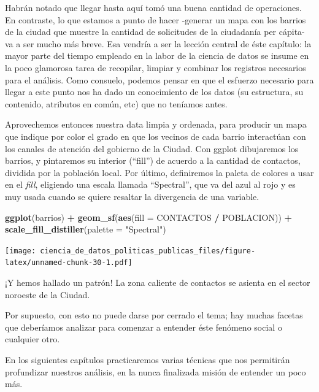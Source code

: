 \documentclass[]{book}
\newenvironment{Shaded}{\begin{snugshade}}{\end{snugshade}}
\newcommand{\KeywordTok}[1]{\textcolor[rgb]{0.13,0.29,0.53}{\textbf{#1}}}
\newcommand{\DataTypeTok}[1]{\textcolor[rgb]{0.13,0.29,0.53}{#1}}
\newcommand{\StringTok}[1]{\textcolor[rgb]{0.31,0.60,0.02}{#1}}
\newcommand{\OperatorTok}[1]{\textcolor[rgb]{0.81,0.36,0.00}{\textbf{#1}}}
\newcommand{\NormalTok}[1]{#1}
\begin{document}
Habrán notado que llegar hasta aquí tomó una buena cantidad de
operaciones. En contraste, lo que estamos a punto de hacer -generar un
mapa con los barrios de la ciudad que muestre la cantidad de solicitudes
de la ciudadanía per cápita- va a ser mucho más breve. Esa vendría a ser
la lección central de éste capítulo: la mayor parte del tiempo empleado
en la labor de la ciencia de datos se insume en la poco glamorosa tarea
de recopilar, limpiar y combinar los registros necesarios para el
análisis. Como consuelo, podemos pensar en que el esfuerzo necesario
para llegar a este punto nos ha dado un conocimiento de los datos (su
estructura, su contenido, atributos en común, etc) que no teníamos
antes.

Aprovechemos entonces nuestra data limpia y ordenada, para producir un
mapa que indique por color el grado en que los vecinos de cada barrio
interactúan con los canales de atención del gobierno de la Ciudad. Con
ggplot dibujaremos los barrios, y pintaremos su interior (``fill'') de
acuerdo a la cantidad de contactos, dividida por la población local. Por
último, definiremos la paleta de colores a usar en el \emph{fill},
eligiendo una escala llamada ``Spectral'', que va del azul al rojo y es
muy usada cuando se quiere resaltar la divergencia de una variable.

\begin{Shaded}
\begin{Highlighting}[]
\KeywordTok{ggplot}\NormalTok{(barrios) }\OperatorTok{+}
\StringTok{    }\KeywordTok{geom_sf}\NormalTok{(}\KeywordTok{aes}\NormalTok{(}\DataTypeTok{fill =}\NormalTok{ CONTACTOS }\OperatorTok{/}\StringTok{ }\NormalTok{POBLACION)) }\OperatorTok{+}
\StringTok{    }\KeywordTok{scale_fill_distiller}\NormalTok{(}\DataTypeTok{palette =} \StringTok{"Spectral"}\NormalTok{)}
\end{Highlighting}
\end{Shaded}

\texttt{[image: ciencia\_de\_datos\_politicas\_publicas\_files/figure-latex/unnamed-chunk-30-1.pdf]}

¡Y hemos hallado un patrón! La zona caliente de contactos se asienta en
el sector noroeste de la Ciudad.

Por supuesto, con esto no puede darse por cerrado el tema; hay muchas
facetas que deberíamos analizar para comenzar a entender éste fenómeno
social o cualquier otro.

En los siguientes capítulos practicaremos varias técnicas que nos
permitirán profundizar nuestros análisis, en la nunca finalizada misión
de entender un poco más.
\end{document}
